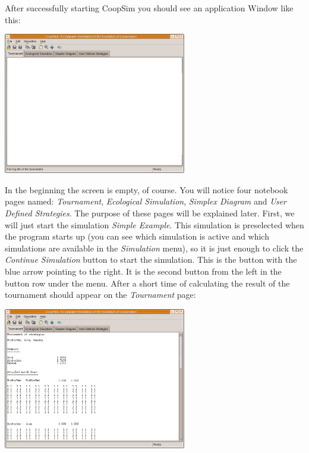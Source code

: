 \documentclass[12pt,a4paper,USenglish]{article}
\begin{document}
After successfully starting CoopSim you should see an application
Window like this:

\begin{center}
\includegraphics[width=8cm,keepaspectratio]{big_images/app_start.png}
\end{center}

In the beginning the screen is empty, of course. You will notice four notebook
pages named: \emph{Tournament}, \emph{Ecological Simulation}, \emph{Simplex
  Diagram} and \emph{User Defined Strategies}. The purpose of these pages will
be explained later. First, we will just start the simulation \emph{Simple
  Example}. This simulation is preselected when the program starts up (you can
see which simulation is active and which simulations are available in the
\emph{Simulation} menu), so it is just enough to click the \emph{Continue
  Simulation} button to start the simulation. This is the button with the
blue arrow pointing to the right. It is the second button from the left
in the button row under the menu. After a short time of calculating the result
of the tournament should appear on the \emph{Tournament} page:

\begin{center}
\includegraphics[width=8cm,keepaspectratio]{big_images/tournament_page.png}
\end{center}
\end{document}
